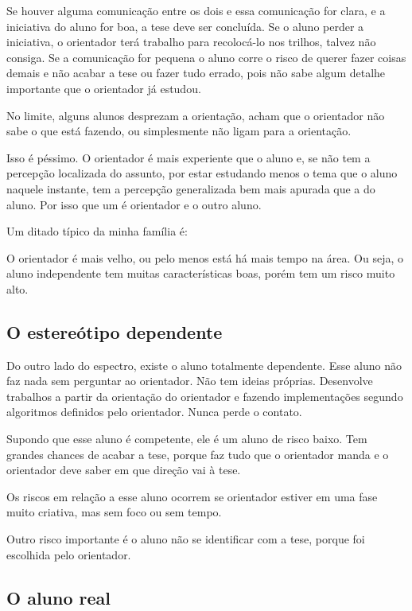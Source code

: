 Se houver alguma comunicação entre os dois e essa comunicação for clara, e a iniciativa do aluno for boa, a tese deve ser concluída. Se o aluno perder a iniciativa, o orientador terá trabalho para recolocá-lo nos trilhos, talvez não consiga. Se a comunicação for pequena o aluno corre o risco de querer fazer coisas demais e não acabar a tese ou fazer tudo errado, pois não sabe algum detalhe importante que o orientador já estudou.


No limite, alguns alunos desprezam a orientação, acham que o orientador não sabe o que está fazendo, ou simplesmente não ligam para a orientação.


Isso é péssimo. O orientador é mais experiente que o aluno e, se não tem a percepção localizada do assunto, por estar estudando menos o tema que o aluno naquele instante, tem a percepção generalizada bem mais apurada que a do aluno. Por isso que um é orientador e o outro aluno.


Um ditado típico da minha família é:




O orientador é mais velho, ou pelo menos está há mais tempo na área. Ou seja, o aluno independente tem muitas características boas, porém tem um risco muito alto.


\subsection{O estereótipo dependente}


Do outro lado do espectro, existe o aluno totalmente dependente. Esse aluno não faz nada sem perguntar ao orientador. Não tem ideias próprias. Desenvolve trabalhos a partir da orientação do orientador e fazendo implementações segundo algoritmos definidos pelo orientador. Nunca perde o contato. 


Supondo que esse aluno é competente, ele é um aluno de risco baixo. Tem grandes chances de acabar a tese, porque faz tudo que o orientador manda e o orientador deve saber em que direção vai à tese. 


Os riscos em relação a esse aluno ocorrem se orientador estiver em uma fase muito criativa, mas sem foco ou sem tempo. 


Outro risco importante é o aluno não se identificar com a tese, porque foi escolhida pelo orientador. 


\subsection{O aluno real}


